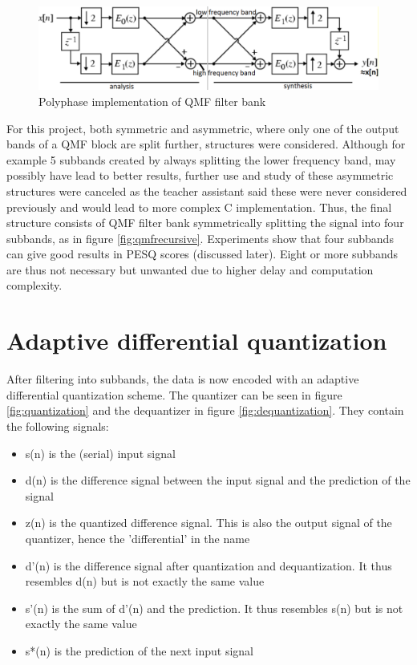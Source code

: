 \documentclass[a4paper]{article}
\begin{document}
\begin{figure}[hbt]
\includegraphics[width = \textwidth]{qmf}
\caption{Polyphase implementation of QMF filter bank}
\label{fig:qmf}
\end{figure}

For this project, both symmetric and asymmetric, where only one of the output bands of a QMF block are split further, structures were considered. Although for example 5 subbands created by always splitting the lower frequency band, may possibly have lead to better results, further use and study of these asymmetric structures were canceled as the teacher assistant said these were never considered previously and would lead to more complex C implementation. Thus, the final structure consists of QMF filter bank symmetrically splitting the signal into four subbands, as in figure \ref{fig:qmfrecursive}. Experiments show that four subbands can give good results in PESQ scores (discussed later). Eight or more subbands are thus not necessary but unwanted due to higher delay and computation complexity.

\section{Adaptive differential quantization}
After filtering into subbands, the data is now encoded with an adaptive differential quantization scheme. The quantizer can be seen in figure \ref{fig:quantization} and the dequantizer in figure \ref{fig:dequantization}. They contain the following signals:

\begin{itemize}
\item s(n) is the (serial) input signal
\item d(n) is the difference signal between the input signal and the prediction of the signal
\item z(n) is the quantized difference signal. This is also the output signal of the quantizer, hence the 'differential' in the name
\item d'(n) is the difference signal after quantization and dequantization. It thus resembles d(n) but is not exactly the same value
\item s'(n) is the sum of d'(n) and the prediction. It thus resembles s(n) but is not exactly the same value
\item s*(n) is the prediction of the next input signal 
\end{itemize}
\end{document}
